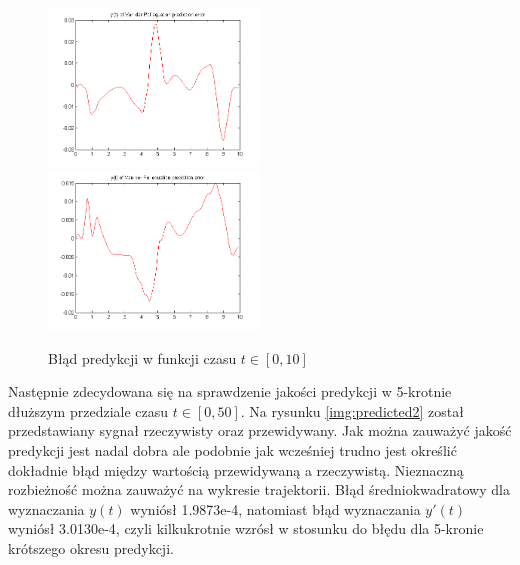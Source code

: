 \begin{figure}[ht!]
	\centering

	\subfloat
	{\includegraphics[width=0.5\textwidth]
	{images/err100_x1.png}}
	\subfloat
	{\includegraphics[width=0.5\textwidth]
	{images/err100_x2.png}}	
	

	\caption{Błąd predykcji w funkcji czasu $t \in [0,10]$}
	\label{img:err100_x}
\end{figure}


Następnie zdecydowana się na sprawdzenie jakości predykcji w 5-krotnie dłuższym przedziale czasu $t \in [0, 50]$. Na rysunku \ref{img:predicted2} został przedstawiany sygnał rzeczywisty oraz przewidywany. Jak można zauważyć jakość predykcji jest nadal dobra ale podobnie jak wcześniej trudno jest określić dokładnie błąd między wartością przewidywaną a rzeczywistą. Nieznaczną rozbieżność można zauważyć na wykresie trajektorii. Błąd średniokwadratowy dla wyznaczania $y(t)$ wyniósł  1.9873e-4, natomiast błąd wyznaczania $y'(t)$ wyniósł 3.0130e-4, czyli kilkukrotnie wzrósł w stosunku do błędu dla 5-kronie krótszego okresu predykcji.

